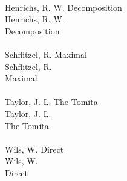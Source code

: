 \documentclass[a4paper,11pt]{article}
\begin{document}
\noindent
{} \\
\Jest  Henrichs, R. W. Decomposition \\
\Powin Henrichs, R. W. \\
Decomposition \\
 \\
\Jest  Schflitzel, R. Maximal \\
\Powin Schflitzel, R. \\
Maximal \\
 \\
\Jest  Taylor, J. L. The Tomita \\
\Powin Taylor, J. L. \\
The Tomita \\
 \\
\Jest  Wils, W. Direct \\
\Powin Wils, W. \\
Direct \\



















{}






\end{document}
